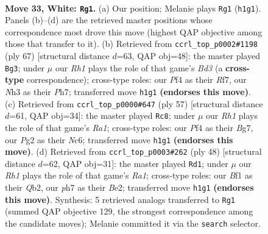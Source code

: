 \documentclass[11pt]{article}
\begin{document}
\clearpage

\begin{figure}[p]\centering
\begin{subfigure}{0.46\textwidth}\centering
\resizebox{\linewidth}{!}{%
\newchessgame
\chessboard[
  setfen={4r1k1/3b1p1p/n1q3p1/4Pp2/p4P2/7N/PQP2KPP/5B1R w - - 2 33},
  showmover=false,
  pgfstyle=straightmove, color=movearrow, markmove={h1-g1}
]}
\caption{}
\end{subfigure}\hfill
\begin{subfigure}{0.46\textwidth}\centering
\resizebox{\linewidth}{!}{%
\newchessgame
\chessboard[
  setfen={6k1/3q1rpp/2pbn3/2p2p2/Q1P4P/P1BP4/1P3NP1/4R1K1 b - - 0 34},
  showmover=false,
  pgfstyle=straightmove, color=movearrow, markmove={d6-g3}
]}
\caption{}
\end{subfigure}
\\[4pt]
\begin{subfigure}{0.46\textwidth}\centering
\resizebox{\linewidth}{!}{%
\newchessgame
\chessboard[
  setfen={r5k1/5pb1/p1n3p1/1pq4p/3p1B2/1P4P1/P1PQ1PBP/4R1K1 b - - 13 29},
  showmover=false,
  pgfstyle=straightmove, color=movearrow, markmove={a8-c8}
]}
\caption{}
\end{subfigure}\hfill
\begin{subfigure}{0.46\textwidth}\centering
\resizebox{\linewidth}{!}{%
\newchessgame
\chessboard[
  setfen={r7/3n1pkp/1pb1pqp1/8/2P5/2N1P3/PQ2BPPP/R5K1 w - - 4 25},
  showmover=false,
  pgfstyle=straightmove, color=movearrow, markmove={a1-d1}
]}
\caption{}
\end{subfigure}
\caption{\textbf{Move 33, White: \texttt{Rg1}.} (a) Our position; Melanie plays \texttt{Rg1} (\texttt{h1g1}). Panels (b)--(d) are the retrieved master positions whose correspondence most drove this move (highest QAP objective among those that transfer to it). (b) Retrieved from \texttt{ccrl\_top\_p0002\#1198} (ply 67) [structural distance $d$=63, QAP obj=48]: the master played \texttt{Bg3}; under $\mu$ our \emph{Rh1} plays the role of that game's \emph{Bd3} (a \textbf{cross-type} correspondence); cross-type roles: our \emph{P}f4 as their \emph{R}f7, our \emph{N}h3 as their \emph{P}h7; transferred move \texttt{h1g1} \textbf{(endorses this move)}. (c) Retrieved from \texttt{ccrl\_top\_p0000\#647} (ply 57) [structural distance $d$=61, QAP obj=34]: the master played \texttt{Rc8}; under $\mu$ our \emph{Rh1} plays the role of that game's \emph{Ra1}; cross-type roles: our \emph{P}f4 as their \emph{B}g7, our \emph{P}g2 as their \emph{N}c6; transferred move \texttt{h1g1} \textbf{(endorses this move)}. (d) Retrieved from \texttt{ccrl\_top\_p0003\#262} (ply 48) [structural distance $d$=62, QAP obj=31]: the master played \texttt{Rd1}; under $\mu$ our \emph{Rh1} plays the role of that game's \emph{Ra1}; cross-type roles: our \emph{B}f1 as their \emph{Q}b2, our \emph{p}h7 as their \emph{B}e2; transferred move \texttt{h1g1} \textbf{(endorses this move)}. Synthesis: 5 retrieved analogs transferred to \texttt{Rg1} (summed QAP objective 129, the strongest correspondence among the candidate moves); Melanie committed it via the \texttt{search} selector.}
\label{fig:thought-m64}
\end{figure}
\end{document}
